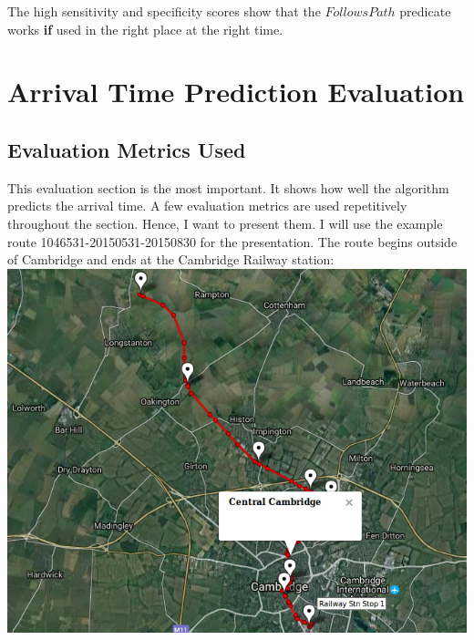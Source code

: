 \documentclass[12pt,a4paper,oneside,openright]{report}
\begin{document}
The high sensitivity and specificity scores show that the $FollowsPath$
predicate works \textbf{if} used in the right place at the right time.

\newpage

\section{Arrival Time Prediction Evaluation}

\subsection{Evaluation Metrics Used}

This evaluation section is the most important. It shows how well the algorithm
predicts the arrival time. A few evaluation metrics are used repetitively
throughout the section. Hence, I want to present them. I will use the example route
1046531-20150531-20150830 for the presentation. The route begins outside of Cambridge
and ends at the Cambridge Railway station: \\

\includegraphics[width=\textwidth]{figs/cambridge_route.png} \\
\end{document}
